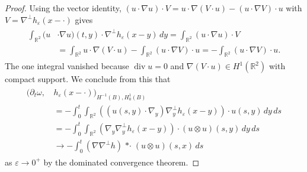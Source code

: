 \documentclass[reqno,openright,11pt,twoside]{amsart}
\theoremstyle{definition}
\numberwithin{equation}{section}
\begin{document}
\begin{proof}
	Using the vector identity, $(u \cdot {\ensuremath{\nabla}} u) \cdot V
	    = u \cdot {\ensuremath{\nabla}} (V \cdot u) - (u \cdot {\ensuremath{\nabla}} V)
	    \cdot u$
    with $V = {\ensuremath{\nabla}}^\perp h_{\ensuremath{\varepsilon}}(x - \cdot)$ gives
	\begin{align}\label{e:SerfatiIDIBP2}
		\begin{split}
		    \int_{{\ensuremath{{\ensuremath{\mathbb{{R}}}}}}^2} (u &\cdot {\ensuremath{\nabla}} u)(t, y)
				    \cdot {\ensuremath{\nabla}}^\perp h_{\ensuremath{\varepsilon}}(x - y) \, dy
			    =
			    \int_{{\ensuremath{{\ensuremath{\mathbb{{R}}}}}}^2} (u \cdot {\ensuremath{\nabla}} u) \cdot V \\
			&= \int_{{\ensuremath{{\ensuremath{\mathbb{{R}}}}}}^2} u \cdot {\ensuremath{\nabla}} (V \cdot u)
			    - \int_{{\ensuremath{{\ensuremath{\mathbb{{R}}}}}}^2} (u \cdot {\ensuremath{\nabla}} V) \cdot u
			=  - \int_{{\ensuremath{{\ensuremath{\mathbb{{R}}}}}}^2} (u \cdot {\ensuremath{\nabla}} V) \cdot u.
		\end{split}
	\end{align}
	{} 
	The one integral vanished because
	$\operatorname{div} u = 0$ and ${\ensuremath{\nabla}} (V \cdot u) \in H^1({\ensuremath{{\ensuremath{\mathbb{{R}}}}}}^2)$
	with compact support.
	We conclude from this that
	\begin{align}\label{e:prtomegagameeps1}
		\begin{split}
			({\ensuremath{\partial}}_t \omega, \, &h_{\ensuremath{\varepsilon}}(x - \cdot))_
					{H^{-1}(B), H_0^1(B)} \\
				&= - \int_0^t \int_{{\ensuremath{{\ensuremath{\mathbb{{R}}}}}}^2} {\ensuremath{\left( {(u(s, y) \cdot {\ensuremath{\nabla}}_y) {\ensuremath{\nabla}}_y^\perp
					h_{\ensuremath{\varepsilon}}(x - y)} \right) }} \cdot u(s, y) \, dy \, ds \\
				&= - \int_0^t \int_{{\ensuremath{{\ensuremath{\mathbb{{R}}}}}}^2} ({\ensuremath{\nabla}}_y {\ensuremath{\nabla}}_y^\perp h_{\ensuremath{\varepsilon}}(x - y))
						\cdot (u \otimes u) (s, y) \, dy \, ds \\
				&\to - \int_0^t ({\ensuremath{\nabla}} {\ensuremath{\nabla}}^\perp h) {\mathop{* \cdot}} (u \otimes u)(s, x)
							\, ds 
		\end{split}
	\end{align}
	as ${\ensuremath{\varepsilon}} \to 0^+$
	by the dominated convergence theorem.
	

\end{proof}
\end{document}

